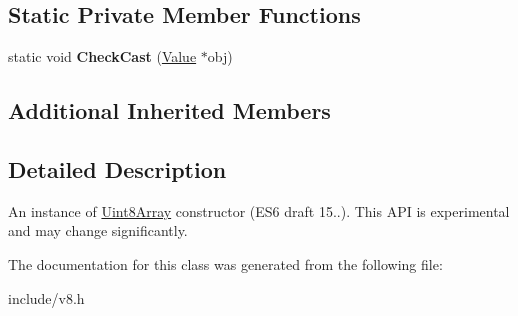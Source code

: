 \subsection*{Static Private Member Functions}
\begin{DoxyCompactItemize}
\item 
static void {\bfseries Check\+Cast} (\hyperlink{classv8_1_1_value}{Value} $\ast$obj)\hypertarget{classv8_1_1_uint8_array_ac87b0988778f67950e27048f71ee24f1}{}\label{classv8_1_1_uint8_array_ac87b0988778f67950e27048f71ee24f1}

\end{DoxyCompactItemize}
\subsection*{Additional Inherited Members}


\subsection{Detailed Description}
An instance of \hyperlink{classv8_1_1_uint8_array}{Uint8\+Array} constructor (E\+S6 draft 15..). This A\+PI is experimental and may change significantly. 

The documentation for this class was generated from the following file\+:\begin{DoxyCompactItemize}
\item 
include/v8.\+h\end{DoxyCompactItemize}
